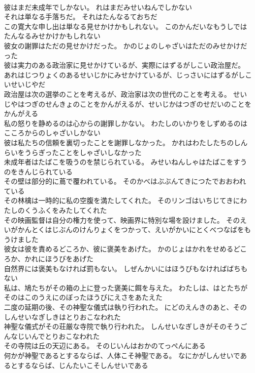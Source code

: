 \documentclass[8pt]{extreport}
\begin{document}
\begin{CJK}{UTF8}{min}
\\	彼はまだ未成年でしかない。	れはまだみせいねんでしかない 
\\	それは単なる手落ちだ。	それはたんなるておちだ 
\\	この寛大な申し出は単なる見せかけかもしれない。	このかんだいなもうしではたんなるみせかけかもしれない 
\\	彼女の謝罪はただの見せかけだった。	かのじょのしゃざいはただのみせかけだった 
\\	彼は実力のある政治家に見せかけているが、実際にはずるがしこい政治屋だ。	あれはじつりょくのあるせいじかにみせかけているが、じっさいにはずるがしこいせいじやだ 
\\	政治屋は次の選挙のことを考えるが、政治家は次の世代のことを考える。	せいじやはつぎのせんきょのことをかんがえるが、せいじかはつぎのせだいのことをかんがえる 
\\	私の怒りを静めるのは心からの謝罪しかない。	わたしのいかりをしずめるのはこころからのしゃざいしかない 
\\	彼は私たちの信頼を裏切ったことを謝罪しなかった。	かれはわたしたちのしんらいをうらぎったことをしゃざいしなかった 
\\	未成年者はたばこを吸うのを禁じられている。	みせいねんしゃはたばこをすうのをきんじられている 
\\	その壁は部分的に蔦で覆われている。	そのかべはぶぶんてきにつたでおおわれている 
\\	その林檎は一時的に私の空腹を満たしてくれた。	そのリンゴはいちじてきにわたしのくうふくをみたしてくれた 
\\	その映画監督は自分の権力を使って、映画界に特別な場を設けました。	そのえいがかんとくはじぶんのけんりょくをつかって、えいがかいにとくべつなばをもうけました 
\\	彼女は彼を責めるどころか、彼に褒美をあげた。	かのじょはかれをせめるどころか、かれにほうびをあげた 
\\	自然界には褒美もなければ罰もない。	しぜんかいにはほうびもなければばちもない 
\\	私は、鳩たちがその箱の上に登った褒美に餌を与えた。	わたしは、はとたちがそのはこのうえにのぼったほうびにえさをあたえた 
\\	二度の延期の後、その神聖な儀式は執り行われた。	にどのえんきのあと、そのしんせいなぎしきはとりおこなわれた 
\\	神聖な儀式がその荘厳な寺院で執り行われた。	しんせいなぎしきがそのそうごんなじいんでとりおこなわれた 
\\	その寺院は丘の天辺にある。	そのじいんはおかのてっぺんにある 
\\	何かが神聖であるとするならば、人体こそ神聖である。	なにかがしんせいであるとするならば、じんたいこそしんせいである 

\end{CJK}
\end{document}
